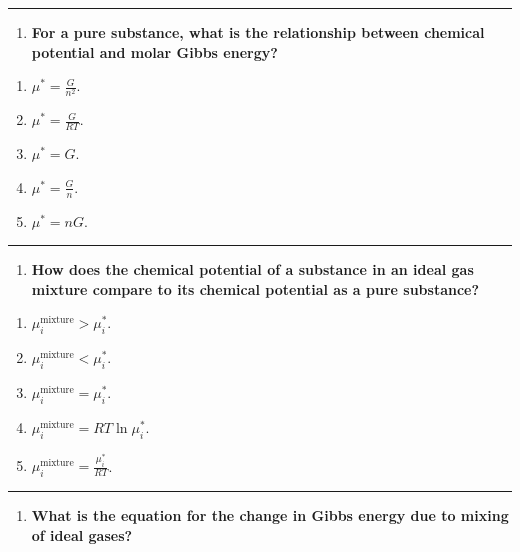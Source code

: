 \documentclass[
  9pt,
]{extbook}
\providecommand{\tightlist}{%
  \setlength{\itemsep}{0pt}\setlength{\parskip}{0pt}}
\theoremstyle{definition}
\theoremstyle{definition}
\theoremstyle{definition}
\theoremstyle{definition}
\theoremstyle{remark}
\begin{document}
\begin{center}\rule{0.5\linewidth}{0.5pt}\end{center}

\begin{enumerate}
\def\labelenumi{\arabic{enumi}.}
\setcounter{enumi}{7}
\tightlist
\item
  \textbf{For a pure substance, what is the relationship between chemical potential and molar Gibbs energy?}
\end{enumerate}

\begin{enumerate}
\def\labelenumi{\alph{enumi}.}
\tightlist
\item
  \(\mu^* = \frac{G}{n^2}\).
\item
  \(\mu^* = \frac{G}{RT}\).
\item
  \(\mu^* = G\).
\item
  \(\mu^* = \frac{G}{n}\).
\item
  \(\mu^* = nG\).
\end{enumerate}

\begin{center}\rule{0.5\linewidth}{0.5pt}\end{center}

\begin{enumerate}
\def\labelenumi{\arabic{enumi}.}
\setcounter{enumi}{8}
\tightlist
\item
  \textbf{How does the chemical potential of a substance in an ideal gas mixture compare to its chemical potential as a pure substance?}
\end{enumerate}

\begin{enumerate}
\def\labelenumi{\alph{enumi}.}
\tightlist
\item
  \(\mu_i^{\text{mixture}} > \mu_i^*\).
\item
  \(\mu_i^{\text{mixture}} < \mu_i^*\).
\item
  \(\mu_i^{\text{mixture}} = \mu_i^*\).
\item
  \(\mu_i^{\text{mixture}} = RT\ln\mu_i^*\).
\item
  \(\mu_i^{\text{mixture}} = \frac{\mu_i^*}{RT}\).
\end{enumerate}

\begin{center}\rule{0.5\linewidth}{0.5pt}\end{center}

\begin{enumerate}
\def\labelenumi{\arabic{enumi}.}
\setcounter{enumi}{9}
\tightlist
\item
  \textbf{What is the equation for the change in Gibbs energy due to mixing of ideal gases?}
\end{enumerate}
\end{document}
